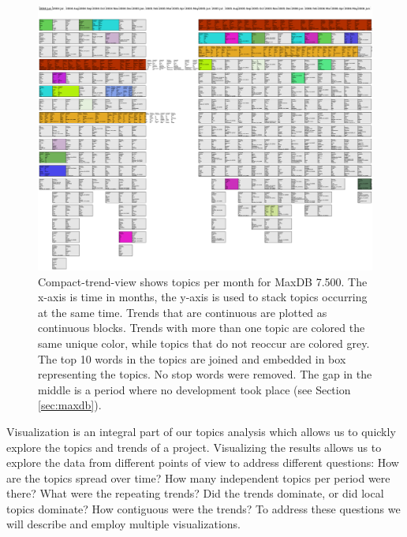 \documentclass[times, 10pt,twocolumn]{article}
\newcommand{\shrinkit}{\vspace*{-.3em}}
\begin{document}
\begin{figure}
  \centering
  \includegraphics[width=1.0\textwidth]{time-smear-plot}%
  \caption{Compact-trend-view shows topics per month for MaxDB
    7.500. The x-axis is time in months, the y-axis is used to stack
    topics occurring at the same time. Trends that are continuous are
    plotted as continuous blocks. Trends with more than one topic are colored the same unique color, while topics that do not reoccur are colored grey.
    The top 10 words in the topics are
    joined and embedded in box representing the topics. No stop words were removed. The gap in the
    middle is a period where no development took place (see Section \ref{sec:maxdb}).}
  \label{fig:topicsmear}
\end{figure}



\shrinkit
{}
\shrinkit
  Visualization is an integral part of our topics analysis which
  allows us to quickly explore the topics and trends of a project.
  Visualizing the results %
  allows us to explore the
  data from different points of view to address different questions:
  How are the topics spread over time?  How many independent topics
  per period were there?  What were the repeating trends?  Did the
  trends dominate, or did local topics dominate?  How contiguous were
  the trends?  
  To address these questions we will describe and employ multiple visualizations.
\end{document}
